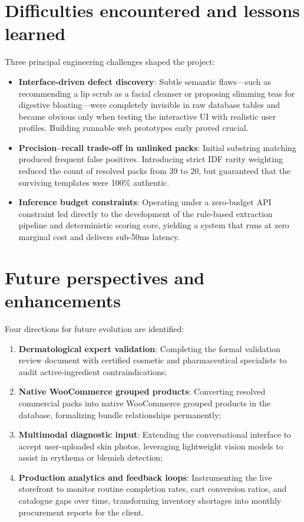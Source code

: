 \section*{Difficulties encountered and lessons learned}

Three principal engineering challenges shaped the project:
\begin{itemize}
  \item \textbf{Interface-driven defect discovery}: Subtle semantic flaws---such as recommending a lip scrub as a facial cleanser or proposing slimming teas for digestive bloating---were completely invisible in raw database tables and became obvious only when testing the interactive UI with realistic user profiles. Building runnable web prototypes early proved crucial.
  \item \textbf{Precision--recall trade-off in unlinked packs}: Initial substring matching produced frequent false positives. Introducing strict IDF rarity weighting reduced the count of resolved packs from 39 to 20, but guaranteed that the surviving templates were 100\% authentic.
  \item \textbf{Inference budget constraints}: Operating under a zero-budget API constraint led directly to the development of the rule-based extraction pipeline and deterministic scoring core, yielding a system that runs at zero marginal cost and delivers sub-50ms latency.
\end{itemize}

\section*{Future perspectives and enhancements}

Four directions for future evolution are identified:
\begin{enumerate}
  \item \textbf{Dermatological expert validation}: Completing the formal validation review document with certified cosmetic and pharmaceutical specialists to audit active-ingredient contraindications;
  \item \textbf{Native WooCommerce grouped products}: Converting resolved commercial packs into native WooCommerce grouped products in the database, formalizing bundle relationships permanently;
  \item \textbf{Multimodal diagnostic input}: Extending the conversational interface to accept user-uploaded skin photos, leveraging lightweight vision models to assist in erythema or blemish detection;
  \item \textbf{Production analytics and feedback loops}: Instrumenting the live storefront to monitor routine completion rates, cart conversion ratios, and catalogue gaps over time, transforming inventory shortages into monthly procurement reports for the client.
\end{enumerate}

